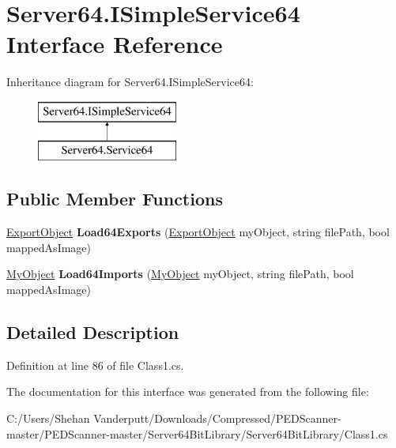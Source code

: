\hypertarget{interface_server64_1_1_i_simple_service64}{}\section{Server64.\+I\+Simple\+Service64 Interface Reference}
\label{interface_server64_1_1_i_simple_service64}
Inheritance diagram for Server64.\+I\+Simple\+Service64\+:\begin{figure}[H]
\begin{center}
\leavevmode
\includegraphics[height=2.000000cm]{interface_server64_1_1_i_simple_service64}
\end{center}
\end{figure}
\subsection*{Public Member Functions}
\begin{DoxyCompactItemize}
\item 
\mbox{\label{interface_server64_1_1_i_simple_service64_aeca689c70d6ab240e8016077d12da6c4}} 
\mbox{\hyperlink{class_objects_1_1_export_object}{Export\+Object}} {\bfseries Load64\+Exports} (\mbox{\hyperlink{class_objects_1_1_export_object}{Export\+Object}} my\+Object, string file\+Path, bool mapped\+As\+Image)
\item 
\mbox{\label{interface_server64_1_1_i_simple_service64_af11082acc79a1408f29a0d81fcaafe0c}} 
\mbox{\hyperlink{class_objects_1_1_my_object}{My\+Object}} {\bfseries Load64\+Imports} (\mbox{\hyperlink{class_objects_1_1_my_object}{My\+Object}} my\+Object, string file\+Path, bool mapped\+As\+Image)
\end{DoxyCompactItemize}


\subsection{Detailed Description}


Definition at line 86 of file Class1.\+cs.



The documentation for this interface was generated from the following file\+:\begin{DoxyCompactItemize}
\item 
C\+:/\+Users/\+Shehan Vanderputt/\+Downloads/\+Compressed/\+P\+E\+D\+Scanner-\/master/\+P\+E\+D\+Scanner-\/master/\+Server64\+Bit\+Library/\+Server64\+Bit\+Library/Class1.\+cs\end{DoxyCompactItemize}
